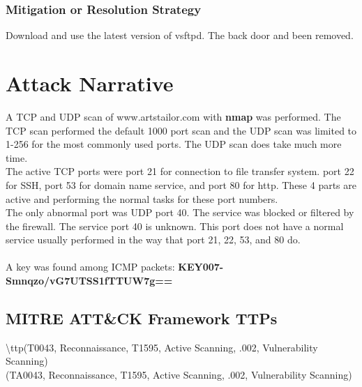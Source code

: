 \documentclass[notitlepage]{article}
\begin{document}
	
	\subsubsection{Mitigation or Resolution Strategy}
	Download and use the latest version of vsftpd. The back door and been removed. \\
	
	\section{Attack Narrative}
	A TCP and UDP scan of www.artstailor.com with \textbf{nmap} was performed.  The TCP scan performed the default 1000 port scan and the UDP scan was limited to 1-256 for the most commonly used ports. The UDP scan does take much more time. \\
	The active TCP ports were port 21 for connection to file transfer system. port 22 for SSH, port 53 for domain name service, and port 80 for http.  These 4 parts are active and performing the normal tasks for these port numbers. \\
	The only abnormal port was UDP port 40. The service was blocked or filtered by the firewall. The service port 40 is unknown. This port does not have a normal service usually performed in the way that port 21, 22, 53, and 80 do. \\ \\
	A key was found among ICMP packets: 
	\textbf{KEY007-Smnqzo/vG7UTSS1fTTUW7g==} \\
	
	\subsection{MITRE ATT{\&}CK Framework TTPs}
	
	\indent\textbackslash ttp(T0043, Reconnaissance, T1595, Active Scanning, .002, Vulnerability Scanning) \\
	
	\ttp(TA0043, Reconnaissance, T1595, Active Scanning, .002, Vulnerability Scanning) \\
\end{document}
